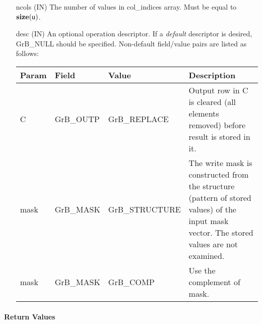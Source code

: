 \begin{itemize}[leftmargin=1.1in]
    \item[{\sf ncols}] ({\sf IN}) The number of values in {\sf col\_indices} array.
    Must be equal to $\bold{size}({\sf u})$.

    \item[{\sf desc}] ({\sf IN}) An optional operation descriptor. If
    a \emph{default} descriptor is desired, {\sf GrB\_NULL} should be
    specified. Non-default field/value pairs are listed as follows:  \\

    \hspace*{-2em}\begin{tabular}{lllp{2.7in}}
        Param & Field  & Value & Description \\
        \hline
        {\sf C}    & {\sf GrB\_OUTP} & {\sf GrB\_REPLACE} &  Output row in 
        {\sf C} is cleared (all elements removed) before result is stored in it.\\

        {\sf mask} & {\sf GrB\_MASK} & {\sf GrB\_STRUCTURE}   & The write mask is
        constructed from the structure (pattern of stored values) of the input
        {\sf mask} vector. The stored values are not examined.\\

        {\sf mask} & {\sf GrB\_MASK} & {\sf GrB\_COMP}   & Use the 
        complement of {\sf mask}. \\
    \end{tabular}
\end{itemize}

\paragraph{Return Values}

